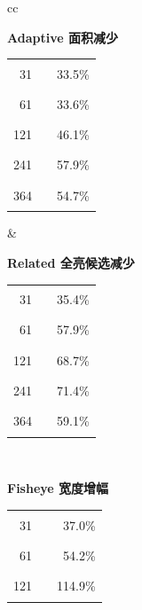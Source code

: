 \documentclass[11pt,a4paper,oneside,extrafontsizes]{memoir}
\begin{document}
\begin{center}
\begin{figure}[htbp]
\centering
\begin{tabular}{cc}
\begin{minipage}[t]{0.46\textwidth}
\centering
\textbf{Adaptive 面积减少}\\[-0.2em]
\begin{tabular}{@{}r l r@{}}
31 & \textcolor{blue!70!black}{\rule{0.1155\textwidth}{1.1ex}} & 33.5\% \\
61 & \textcolor{blue!70!black}{\rule{0.1159\textwidth}{1.1ex}} & 33.6\% \\
121 & \textcolor{blue!70!black}{\rule{0.1591\textwidth}{1.1ex}} & 46.1\% \\
241 & \textcolor{blue!70!black}{\rule{0.2000\textwidth}{1.1ex}} & 57.9\% \\
364 & \textcolor{blue!70!black}{\rule{0.1887\textwidth}{1.1ex}} & 54.7\% \\
\end{tabular}
\end{minipage}
&
\begin{minipage}[t]{0.46\textwidth}
\centering
\textbf{Related 全亮候选减少}\\[-0.2em]
\begin{tabular}{@{}r l r@{}}
31 & \textcolor{blue!70!black}{\rule{0.0992\textwidth}{1.1ex}} & 35.4\% \\
61 & \textcolor{blue!70!black}{\rule{0.1623\textwidth}{1.1ex}} & 57.9\% \\
121 & \textcolor{blue!70!black}{\rule{0.1926\textwidth}{1.1ex}} & 68.7\% \\
241 & \textcolor{blue!70!black}{\rule{0.2000\textwidth}{1.1ex}} & 71.4\% \\
364 & \textcolor{blue!70!black}{\rule{0.1656\textwidth}{1.1ex}} & 59.1\% \\
\end{tabular}
\end{minipage} \\[1.2em]
\begin{minipage}[t]{0.46\textwidth}
\centering
\textbf{Fisheye 宽度增幅}\\[-0.2em]
\begin{tabular}{@{}r l r@{}}
31 & \textcolor{blue!70!black}{\rule{0.0247\textwidth}{1.1ex}} & 37.0\% \\
61 & \textcolor{blue!70!black}{\rule{0.0361\textwidth}{1.1ex}} & 54.2\% \\
121 & \textcolor{blue!70!black}{\rule{0.0765\textwidth}{1.1ex}} & 114.9\% \\

\end{tabular}
\end{minipage}
\end{tabular}
\end{figure}
\end{center}
\end{document}
